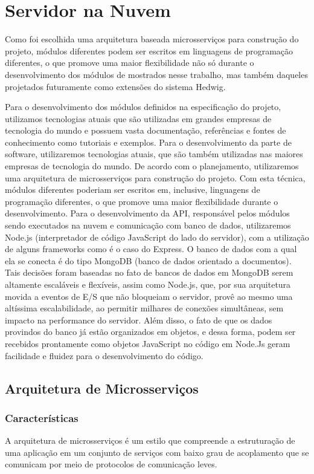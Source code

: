 \section{Servidor na Nuvem}
Como foi escolhida uma arquitetura baseada microsserviços para construção do projeto, módulos diferentes podem ser escritos em linguagens de programação diferentes, o que promove uma maior flexibilidade não só durante o desenvolvimento dos módulos de mostrados nesse trabalho, mas também daqueles projetados futuramente como extensões do sistema Hedwig.

Para o desenvolvimento dos módulos definidos na especificação do projeto, utilizamos tecnologias atuais que são utilizadas em grandes empresas de tecnologia do mundo e possuem vasta documentação, referências e fontes de conhecimento como tutoriais e exemplos.
Para o desenvolvimento da parte de software, utilizaremos tecnologias atuais, que são também utilizadas nas maiores empresas de tecnologia do mundo. De acordo com o planejamento, utilizaremos uma arquitetura de microsserviços para construção do projeto. Com esta técnica, módulos diferentes poderiam ser escritos em, inclusive, linguagens de programação diferentes, o que promove uma maior flexibilidade durante o desenvolvimento.
Para o desenvolvimento da API, responsável pelos módulos sendo executados na nuvem e comunicação com banco de dados, utilizaremos Node.js (interpretador de código JavaScript do lado do servidor), com a utilização de alguns frameworks como é o caso do Express. O banco de dados com a qual ela se conecta é do tipo MongoDB (banco de dados orientado a documentos). Tais decisões foram baseadas no fato de bancos de dados em MongoDB serem altamente escaláveis e flexíveis, assim como Node.js, que, por sua arquitetura movida a eventos de E/S que não bloqueiam o servidor, provê ao mesmo uma altíssima escalabilidade, ao permitir milhares de conexões simultâneas, sem impacto na performance do servidor. Além disso, o fato de que os dados provindos do banco já estão organizados em objetos, e dessa forma, podem ser recebidos prontamente como objetos JavaScript no código em Node.Js geram facilidade e fluidez para o desenvolvimento do código.

\subsection{Arquitetura de Microsserviços}
\subsubsection{Características}
A arquitetura de microsserviços é um estilo que compreende a estruturação de uma aplicação em um conjunto de serviços com baixo grau de acoplamento que se comunicam por meio de protocolos de comunicação leves.

